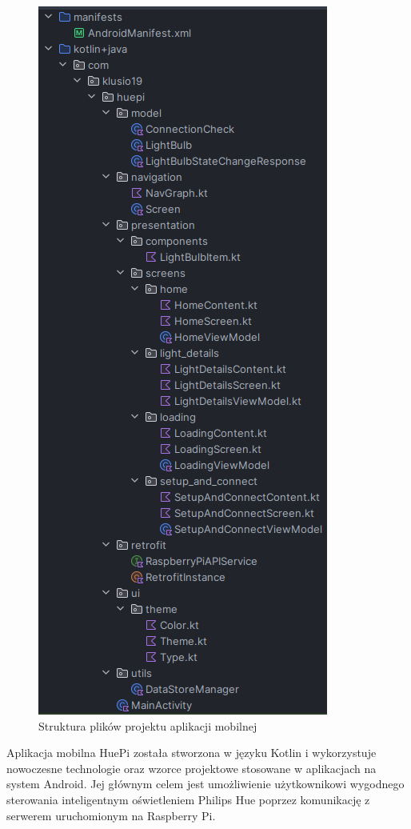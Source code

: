 \documentclass[12pt]{article}
\begin{document}
\begin{figure}[H]
    \centering
    \hypertarget{fig:struktura-plików-aplikacja-mobilna}{}
    \includegraphics[scale=0.8]{figures/struktura-plikow-aplikacja-mobilna.png}
    \caption{Struktura plików projektu aplikacji mobilnej}
    \label{fig:struktura-plików-raspberry}
\end{figure}


Aplikacja mobilna HuePi została stworzona w języku Kotlin i wykorzystuje nowoczesne technologie oraz wzorce projektowe stosowane w aplikacjach na system Android. Jej głównym
celem jest umożliwienie użytkownikowi wygodnego sterowania inteligentnym oświetleniem Philips Hue poprzez komunikację z serwerem uruchomionym na Raspberry Pi. 
\end{document}
